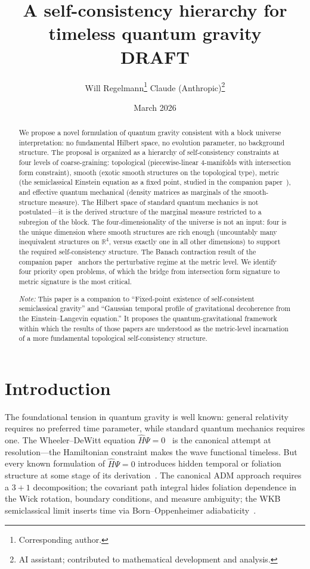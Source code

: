 \documentclass[12pt,a4paper]{article}
\title{\textbf{A self-consistency hierarchy for timeless quantum gravity}\\[6pt]
{\large DRAFT}}
\author{Will Regelmann\thanks{Corresponding author.} \quad Claude (Anthropic)\thanks{AI
assistant; contributed to mathematical development and analysis.}}
\date{March 2026}
\theoremstyle{definition}
\theoremstyle{remark}
\begin{document}
\maketitle

\begin{abstract}
We propose a novel formulation of quantum gravity consistent with a block
universe interpretation: no fundamental Hilbert space, no evolution parameter,
no background structure. The proposal is organized as a hierarchy of
self-consistency constraints at four levels of coarse-graining: topological
(piecewise-linear 4-manifolds with intersection form constraint), smooth
(exotic smooth structures on the topological type), metric (the semiclassical
Einstein equation as a fixed point, studied in the companion
paper~\cite{fixed_point}), and effective quantum mechanical (density matrices
as marginals of the smooth-structure measure). The Hilbert space of standard
quantum mechanics is not postulated---it is the derived structure of the
marginal measure restricted to a subregion of the block. The four-dimensionality
of the universe is not an input: four is the unique dimension where smooth
structures are rich enough (uncountably many inequivalent structures on
$\mathbb{R}^4$, versus exactly one in all other dimensions) to support the
required self-consistency structure. The Banach contraction result of the
companion paper~\cite{fixed_point} anchors the perturbative regime at the
metric level. We identify four priority open problems, of which the bridge
from intersection form signature to metric signature is the most critical.

\bigskip\noindent\textit{Note:} This paper is a companion to ``Fixed-point
existence of self-consistent semiclassical gravity'' and ``Gaussian temporal
profile of gravitational decoherence from the Einstein--Langevin equation.''
It proposes the quantum-gravitational framework within which the results of
those papers are understood as the metric-level incarnation of a more
fundamental topological self-consistency structure.
\end{abstract}

\section{Introduction}
\label{sec:intro}

The foundational tension in quantum gravity is well known: general relativity
requires no preferred time parameter, while standard quantum mechanics requires
one. The Wheeler--DeWitt equation $\hat{H}\Psi = 0$~\cite{dewitt,wheeler} is
the canonical attempt at resolution---the Hamiltonian constraint makes the
wave functional timeless. But every known formulation of $\hat{H}\Psi = 0$
introduces hidden temporal or foliation structure at some stage of its
derivation~\cite{kuchar}. The canonical ADM approach requires a $3+1$
decomposition; the covariant path integral hides foliation dependence in the
Wick rotation, boundary conditions, and measure ambiguity; the WKB
semiclassical limit inserts time via Born--Oppenheimer
adiabaticity~\cite{halliwell,banks}.
\end{document}
